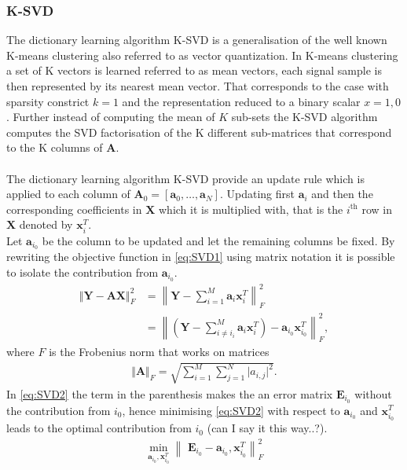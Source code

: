 \subsubsection{K-SVD}
The dictionary learning algorithm K-SVD is a generalisation of the well known K-means clustering also referred to as vector quantization. In K-means clustering a set of K vectors is learned referred to as mean vectors, each signal sample is then represented by its nearest mean vector. That corresponds to the case with sparsity constrict $k=1$ and the representation reduced to a binary scalar $x={1,0}$. Further instead of computing the mean of $K$ sub-sets the K-SVD algorithm computes the SVD factorisation of the K different sub-matrices that correspond to the K columns of $\textbf{A}$.\\
\\
The dictionary learning algorithm K-SVD provide an update rule which is applied to each column of $\textbf{A}_0 = \left[ \textbf{a}_0, \hdots , \textbf{a}_N \right] $. Updating first $\textbf{a}_i$ and then the corresponding coefficients in $\textbf{X}$ which it is multiplied with, that is the $i^{\text{th}}$ row in $\textbf{X}$ denoted by $\textbf{x}_i^T$.\\
Let $\textbf{a}_{i_{0}}$ be the column to be updated and let the remaining columns be fixed. By rewriting the objective function in \eqref{eq:SVD1} using matrix notation it is possible to isolate the contribution from $\textbf{a}_{i_{0}}$.
\begin{align}
\Vert \textbf{Y} - \textbf{AX} \Vert_{F}^{2} 
&= \left\| \textbf{Y} - \sum_{i=1}^{M} \textbf{a}_i \textbf{x}_i^{T} \right\|_{F}^{2}\nonumber\\
&= \left\| \left( \textbf{Y}- \sum_{i\neq i_{i}}^{M} \textbf{a}_i\textbf{x}_i^{T}\right) - \textbf{a}_{i_{0}}\textbf{x}_{i_{0}}^{T} \right\| _{F}^{2},\label{eq:SVD2} 
\end{align}
where $F$ is the Frobenius norm that works on matrices
\begin{align*}
\Vert \mathbf{A} \Vert_F = \sqrt{\sum_{i=1}^M \sum_{j=1}^N \vert a_{i,j} \vert^2}.
\end{align*} 
In \eqref{eq:SVD2} the term in the parenthesis makes the an error matrix $\textbf{E}_{i_0}$ without the contribution from $i_{0}$, hence minimising \eqref{eq:SVD2} with respect to $\textbf{a}_{i_{0}}$ and $\textbf{x}_{i_{0}}^{T}$ leads to the optimal contribution from $i_{0}$ (can I say it this way..?). 
\begin{align}
\min_{\textbf{a}_{i_{0}},\textbf{x}_{i_0}^{T}}\left\|\textbf{ E}_{i_{0}}-\textbf{a}_{i_{0}},\textbf{x}_{i_0}^{T} \right\|_{F}^{2}\label{eq:SVD3}
\end{align} 
